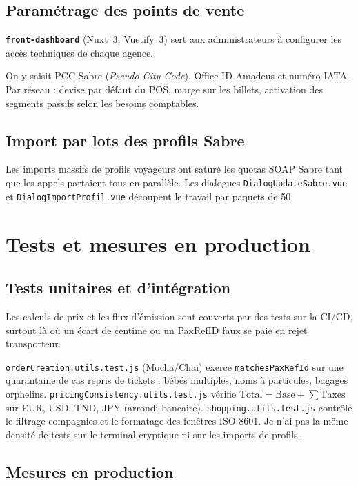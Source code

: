 \section{Paramétrage des points de vente}

\textbf{\texttt{front-dashboard}} (Nuxt~3, Vuetify~3) sert aux administrateurs à configurer les accès techniques de chaque agence.

On y saisit PCC Sabre (\textit{Pseudo City Code}), Office ID Amadeus et numéro IATA. Par réseau : devise par défaut du POS, marge sur les billets, activation des segments passifs selon les besoins comptables.

\section{Import par lots des profils Sabre}

Les imports massifs de profils voyageurs ont saturé les quotas SOAP Sabre tant que les appels partaient tous en parallèle. Les dialogues \texttt{DialogUpdateSabre.vue} et \texttt{DialogImportProfil.vue} découpent le travail par paquets de 50.

\chapter{Tests et mesures en production}
\label{chap:assurance_qualite}

\section{Tests unitaires et d'intégration}

Les calculs de prix et les flux d'émission sont couverts par des tests sur la CI/CD, surtout là où un écart de centime ou un PaxRefID faux se paie en rejet transporteur.

\texttt{orderCreation.utils.test.js} (Mocha/Chai) exerce \texttt{matchesPaxRefId} sur une quarantaine de cas repris de tickets : bébés multiples, noms à particules, bagages orphelins. \texttt{pricingConsistency.utils.test.js} vérifie $\text{Total} = \text{Base} + \sum \text{Taxes}$ sur EUR, USD, TND, JPY (arrondi bancaire). \texttt{shopping.utils.test.js} contrôle le filtrage compagnies et le formatage des fenêtres ISO 8601. Je n'ai pas la même densité de tests sur le terminal cryptique ni sur les imports de profils.

\section{Mesures en production}


